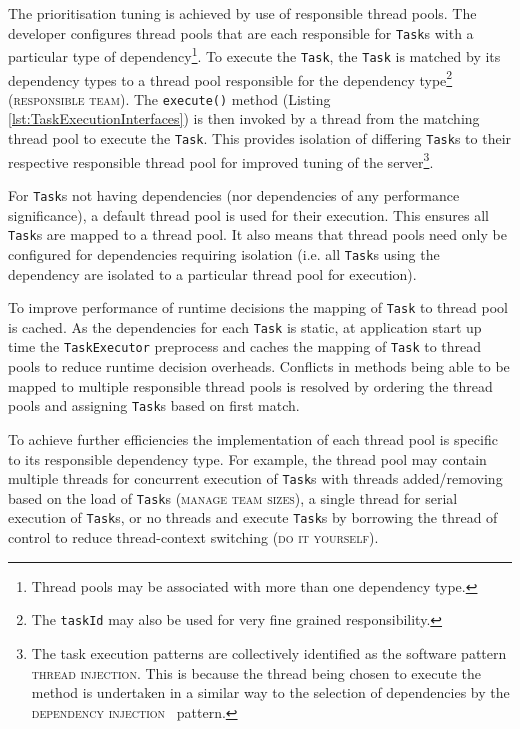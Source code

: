 \documentclass[prodmode]{style/acmlarge}
\begin{document}
The prioritisation tuning is achieved by use of responsible thread pools.  The
developer configures thread pools that are each responsible for \texttt{Task}s
with a particular type of dependency\footnote{Thread pools may be associated
with more than one dependency type.}.  To execute the \texttt{Task}, the
\texttt{Task} is matched by its dependency types to a thread pool responsible
for the dependency type\footnote{The \texttt{taskId} may also be used for very
fine grained responsibility.} (\textsc{responsible team}).  The
\texttt{execute()} method (Listing \ref{lst:TaskExecutionInterfaces}) is then
invoked by a thread from the matching thread pool to execute the \texttt{Task}.
This provides isolation of differing \texttt{Task}s to their respective
responsible thread pool for improved tuning of the server\footnote{The task
execution patterns are collectively identified as the software pattern
\textsc{thread injection}.  This is because the thread being chosen to execute
the method is undertaken in a similar way to the selection of dependencies by
the \textsc{dependency injection}~\cite{ioc} pattern.}.

For \texttt{Task}s not having dependencies (nor dependencies of any performance
significance), a default thread pool is used for their execution.  This ensures
all \texttt{Task}s are mapped to a thread pool.  It also means that thread pools
need only be configured for dependencies requiring isolation (i.e. all
\texttt{Task}s using the dependency are isolated to a particular thread pool for
execution).

To improve performance of runtime decisions the mapping of \texttt{Task} to
thread pool is cached.  As the dependencies for each \texttt{Task} is static, at
application start up time the \texttt{TaskExecutor} preprocess and caches the
mapping of \texttt{Task} to thread pools to reduce runtime decision overheads.
Conflicts in methods being able to be mapped to multiple responsible thread
pools is resolved by ordering the thread pools and assigning \texttt{Task}s
based on first match.

To achieve further efficiencies the implementation of each thread pool is
specific to its responsible dependency type.  For example, the thread pool may
contain multiple threads for concurrent execution of \texttt{Task}s with threads
added/removing based on the load of \texttt{Task}s (\textsc{manage team sizes}),
a single thread for serial execution of \texttt{Task}s, or no threads and
execute \texttt{Task}s by borrowing the thread of control to reduce
thread-context switching (\textsc{do it yourself}).
\end{document}

